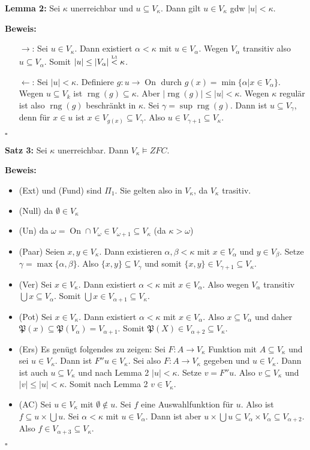 \documentclass[a4paper,fontsize=11pt]{scrartcl}
\newcommand{\rng}{\operatorname{rng}}
\newcommand{\On}{\operatorname{On}}
\begin{document}
{\bf Lemma 2:} Sei $\kappa$ unerreichbar und $u\subseteq
V_\kappa$. Dann gilt $u\in V_\kappa$ gdw $|u|<\kappa$.

{\bf Beweis:}
\begin{itemize}
\item[$\rightarrow$:] Sei $u\in V_\kappa$. Dann existiert
  $\alpha<\kappa$ mit $u\in V_\alpha$. Wegen $V_\alpha$ transitiv also
  $u\subseteq V_\alpha$. Somit $|u|\le|V_\alpha|
  \stackrel{\mbox{\tiny L1}}{<} \kappa$.
\item[$\leftarrow$:] Sei $|u|<\kappa$. Definiere $g:u\rightarrow \On$
  durch $g(x)=\min\{\alpha|x\in V_\alpha\}$. Wegen $u\subseteq V_k$
  ist $\rng(g)\subseteq\kappa$. Aber $|\rng(g)|\le |u|<\kappa$. Wegen
  $\kappa$ regulär ist also $\rng(g)$ beschränkt in $\kappa$. Sei
  $\gamma=\sup \rng (g)$. Dann ist $u\subseteq V_\gamma$, denn für
  $x\in u$ ist $x\in V_{g(x)}\subseteq V_\gamma$. Also $u\in
  V_{\gamma+1}\subseteq V_\kappa$.
\end{itemize}
\hfill $\square$

{\bf Satz 3:} Sei $\kappa$ unerreichbar. Dann $V_\kappa\models ZFC$.

{\bf Beweis:}
\begin{itemize}
\item (Ext) und (Fund) sind $\Pi_1$. Sie gelten also in $V_\kappa$, da
  $V_\kappa$ trasitiv.
\item (Null) da $\emptyset\in V_\kappa$
\item (Un) da $\omega=\On\cap V_\omega \in V_{\omega+1}\subseteq
  V_\kappa$ (da $\kappa>\omega$)
\item (Paar) Seien $x,y\in V_\kappa$. Dann existieren
  $\alpha,\beta<\kappa$ mit $x\in V_\alpha$ und $y\in V_\beta$. Setze
  $\gamma=\max\{\alpha,\beta\}$. Also $\{x,y\}\subseteq V_\gamma$ und
  somit $\{x,y\}\in V_{\gamma+1}\subseteq V_\kappa$.
\item (Ver) Sei $x\in V_\kappa$. Dann existiert $\alpha<\kappa$ mit
  $x\in V_\alpha$. Also wegen $V_\alpha$ transitiv $\bigcup x\subseteq
  V_\alpha$. Somit $\bigcup x\in V_{\alpha+1}\subseteq V_\kappa$.
\item (Pot) Sei $x\in V_\kappa$. Dann existiert $\alpha<\kappa$ mit
  $x\in V_\alpha$. Also $x\subseteq V_\alpha$ und daher
  $\mathfrak{P}(x)\subseteq\mathfrak{P}(V_\alpha)=V_{\alpha+1}$. Somit
  $\mathfrak{P}(X)\in V_{\alpha+2}\subseteq V_\kappa$.
\item (Ers) Es genügt folgendes zu zeigen: Sei $F:A\rightarrow
  V_\kappa$ Funktion mit $A\subseteq V_\kappa$ und sei $u\in
  V_\kappa$. Dann ist $F''u\in V_\kappa$. Sei also $F:A\rightarrow
  V_\kappa$ gegeben und $u\in V_\kappa$. Dann ist auch $u\subseteq
  V_\kappa$ und nach Lemma 2 $|u|<\kappa$. Setze $v=F''u$. Also
  $v\subseteq V_\kappa$ und $|v|\le |u|<\kappa$. Somit nach Lemma 2
  $v\in V_\kappa$.
\item (AC) Sei $u\in V_\kappa$ mit $\emptyset\not\in u$. Sei $f$ eine
  Auswahlfunktion für $u$. Also ist $f\subseteq u\times\bigcup u$. Sei
  $\alpha<\kappa$ mit $u\in V_\alpha$. Dann ist aber $u\times\bigcup
  u\subseteq V_\alpha\times V_\alpha\subseteq V_{\alpha+2}$. Also
  $f\in V_{\alpha+3}\subseteq V_\kappa$.
\end{itemize}
\hfill $\square$
\end{document}

